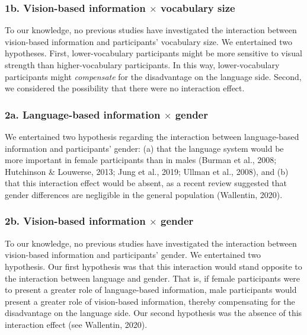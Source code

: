 \documentclass[
  12pt,
  man,floatsintext]{apa7}
\begin{document}
\hypertarget{b.-vision-based-information-times-vocabulary-size}{%
\subsubsection{\texorpdfstring{1b. Vision-based information \(\times\) vocabulary size}{1b. Vision-based information \textbackslash times vocabulary size}}\label{b.-vision-based-information-times-vocabulary-size}}

To our knowledge, no previous studies have investigated the interaction between vision-based information and participants' vocabulary size. We entertained two hypotheses. First, lower-vocabulary participants might be more sensitive to visual strength than higher-vocabulary participants. In this way, lower-vocabulary participants might \emph{compensate} for the disadvantage on the language side. Second, we considered the possibility that there were no interaction effect.

\hypertarget{a.-language-based-information-times-gender}{%
\subsubsection{\texorpdfstring{2a. Language-based information \(\times\) gender}{2a. Language-based information \textbackslash times gender}}\label{a.-language-based-information-times-gender}}

We entertained two hypothesis regarding the interaction between language-based information and participants' gender: (a) that the language system would be more important in female participants than in males (Burman et al., 2008; Hutchinson \& Louwerse, 2013; Jung et al., 2019; Ullman et al., 2008), and (b) that this interaction effect would be absent, as a recent review suggested that gender differences are negligible in the general population (Wallentin, 2020).

\hypertarget{b.-vision-based-information-times-gender}{%
\subsubsection{\texorpdfstring{2b. Vision-based information \(\times\) gender}{2b. Vision-based information \textbackslash times gender}}\label{b.-vision-based-information-times-gender}}

To our knowledge, no previous studies have investigated the interaction between vision-based information and participants' gender. We entertained two hypothesis. Our first hypothesis was that this interaction would stand opposite to the interaction between language and gender. That is, if female participants were to present a greater role of language-based information, male participants would present a greater role of vision-based information, thereby compensating for the disadvantage on the language side. Our second hypothesis was the absence of this interaction effect (see Wallentin, 2020).
\end{document}
